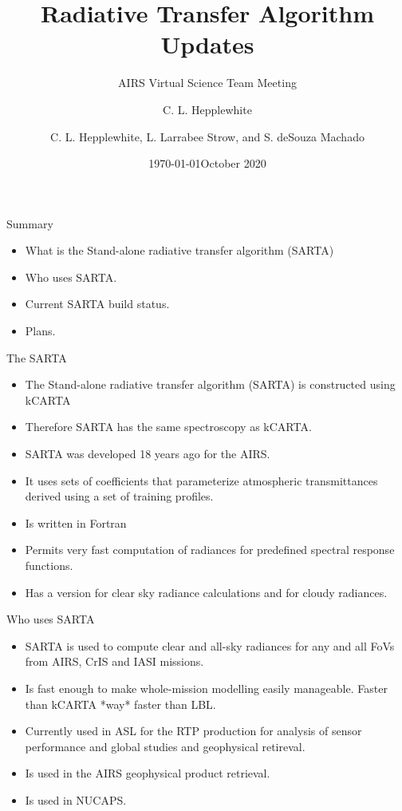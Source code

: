 \documentclass[10pt,t]{beamer}
\author{C. L. Hepplewhite}
\date{\today}
\title{\large Radiative Transfer Algorithm Updates}
\subtitle{\footnotesize{AIRS Virtual Science Team Meeting}}
\date{\vspace{0.1in}\footnotesize{October 2020 \vfill}}
\author{C. L. Hepplewhite\inst{1,2}, L. Larrabee Strow\inst{1,2}, and S. deSouza Machado\inst{1,2} }
\institute[UMBC]{\inst{1} UMBC Physics Dept. \and \inst{2}UMBC JCET}
\begin{document}
\maketitle

\begin{frame}{Summary}
\begin{itemize}
  \item What is the Stand-alone radiative transfer algorithm (SARTA)
  \item Who uses SARTA.
  \item Current SARTA build status.
  \item Plans.
    
\end{itemize}

\end{frame}
\begin{frame}{The SARTA}

  \begin{itemize}
  \item The Stand-alone radiative transfer algorithm (SARTA) is constructed using kCARTA
  \item Therefore SARTA has the same spectroscopy as kCARTA.
  \item SARTA was developed 18 years ago for the AIRS.
  \item It uses sets of coefficients that parameterize atmospheric transmittances derived using a set of training profiles.
  \item Is written in Fortran
  \item Permits very fast computation of radiances for predefined spectral response functions.
    \item Has a version for clear sky radiance calculations and for cloudy radiances.
    
\end{itemize}

\end{frame}
\begin{frame}{Who uses SARTA}

  \begin{itemize}
  \item SARTA is used to compute clear and all-sky radiances for any and all FoVs from AIRS, CrIS and IASI missions.
  \item Is fast enough to make whole-mission modelling easily manageable. Faster than kCARTA *way* faster than LBL.
  \item Currently used in ASL for the RTP production for analysis of sensor performance and global studies and geophysical retireval.
  \item Is used in the AIRS geophysical product retrieval.
    \item Is used in NUCAPS.

  \end{itemize}
\end{frame}
\end{document}

